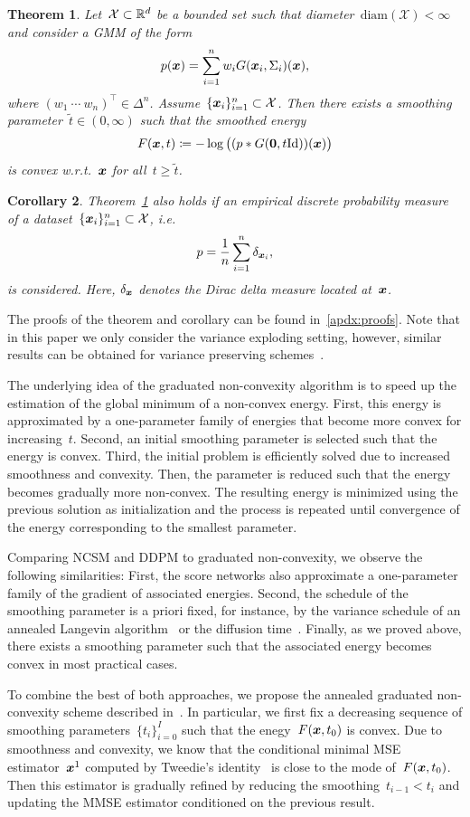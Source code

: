 \documentclass[nohyperref]{article}
\newcommand{\X}{\mathcal{X}}
\newcommand{\id}{\mathrm{Id}}
\renewcommand{\vec}[1]{\mathbf{#1}}
\newcommand{\diameter}{\mathrm{diam}}
\theoremstyle{plain}
\newtheorem{theorem}{Theorem}[section]
\newtheorem{corollary}[theorem]{Corollary}
\theoremstyle{definition}
\theoremstyle{remark}
\begin{document}
\begin{theorem}\label{thm:Fconvex}
Let~$\X\subset\R^d$ be a bounded set such that diameter~$\diameter(\X)<\infty$ and consider a GMM of the form
\[
p({\bm{x}}) = \sum_{i=1}^n w_i G({\bm{x}}_i,\Sigma_i)({\bm{x}}),
\]
where $(w_1\ \cdots \ w_n)^\top\in\Delta^n$. Assume~$\{\vx_i\}_{i=1}^n\subset\X$.
Then there exists a smoothing parameter~$\widetilde{t}\in(0,\infty)$ such that the smoothed energy
\[
F(\vx,t)\coloneqq -\log \big( (p \ast G(\vec{0}, t\id))(\vx)\big)
\]
is \emph{convex} w.r.t.~${\bm{x}}$ for all~$t\geq\widetilde{t}$.
\end{theorem}
\begin{corollary}\label{cor:empirical}
Theorem~\ref{thm:Fconvex} also holds if an empirical discrete probability measure of a dataset~$\{\vx_i\}_{i=1}^n\subset\X$, i.e.
\[
p = \frac{1}{n}\sum_{i=1}^n\delta_{{\bm{x}}_i},
\]
is considered.
Here, $\delta_{{\bm{x}}}$ denotes the Dirac delta measure located at~${\bm{x}}$.
\end{corollary}
The proofs of the theorem and corollary can be found in~\cref{apdx:proofs}.
Note that in this paper we only consider the variance exploding setting, however, similar results can be obtained for variance preserving schemes~\citep{SoSo20}. 

The underlying idea of the graduated non-convexity algorithm is to speed up the estimation of the global minimum of a non-convex energy.
First, this energy is approximated by a one-parameter family of energies that become more convex for increasing~$t$.
Second, an initial smoothing parameter is selected such that the energy is convex.
Third, the initial problem is efficiently solved due to increased smoothness and convexity.
Then, the parameter is reduced such that the energy becomes gradually more non-convex.
The resulting energy is minimized using the previous solution as initialization and the process is repeated until convergence of the energy corresponding to the smallest parameter.

Comparing NCSM and DDPM to graduated non-convexity, we observe the following similarities:
First, the score networks also approximate a one-parameter family of the gradient of associated energies.
Second, the schedule of the smoothing parameter is a priori fixed, for instance, by the variance schedule of an annealed Langevin algorithm~\citep{SoEr19} or the diffusion time~\citep{HoJa20}.
Finally, as we proved above, there exists a smoothing parameter such that the associated energy becomes convex in most practical cases.

To combine the best of both approaches, we propose the annealed graduated non-convexity scheme described in~.
In particular, we first fix a decreasing sequence of smoothing parameters~$\{t_i\}_{i=0}^I$ such that the enegy~$F({\bm{x}},t_0)$ is convex.
Due to smoothness and convexity, we know that the conditional minimal MSE estimator~${\bm{x}}^1$ computed by Tweedie's identity~\citep{Ro56,Ef11} is close to the mode of~$F({\bm{x}},t_0)$.
Then this estimator is gradually refined by reducing the smoothing~$t_{i-1}<t_i$ and updating the MMSE estimator conditioned on the previous result.
\end{document}
